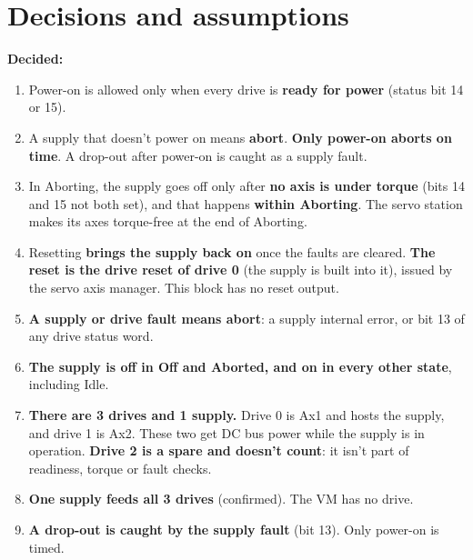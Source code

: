 \documentclass[11pt,a4paper]{report}
\newcommand{\decided}{\textcolor{decided}{\textbf{Decided}}}
\begin{document}
\section{Decisions and assumptions}

\textbf{\decided:}
\begin{enumerate}
  \item Power-on is allowed only when every drive is \textbf{ready for power} (status bit 14 or
        15).
  \item A supply that doesn't power on means \textbf{abort}. \textbf{Only power-on aborts on
        time}. A drop-out after power-on is caught as a supply fault.
  \item In Aborting, the supply goes off only after \textbf{no axis is under torque} (bits 14 and
        15 not both set), and that happens \textbf{within Aborting}. The servo station makes its
        axes torque-free at the end of Aborting.
  \item Resetting \textbf{brings the supply back on} once the faults are cleared. \textbf{The
        reset is the drive reset of drive 0} (the supply is built into it), issued by the servo
        axis manager. This block has no reset output.
  \item \textbf{A supply or drive fault means abort}: a supply internal error, or bit 13 of any
        drive status word.
  \item \textbf{The supply is off in Off and Aborted, and on in every other state}, including
        Idle.
  \item \textbf{There are 3 drives and 1 supply.} Drive 0 is Ax1 and hosts the supply, and
        drive 1 is Ax2. These two get DC bus power while the supply is in operation.
        \textbf{Drive 2 is a spare and doesn't count}: it isn't part of readiness, torque or
        fault checks.
  \item \textbf{One supply feeds all 3 drives} (confirmed). The VM has no drive.
  \item \textbf{A drop-out is caught by the supply fault} (bit 13). Only power-on is timed.
\end{enumerate}
\end{document}
